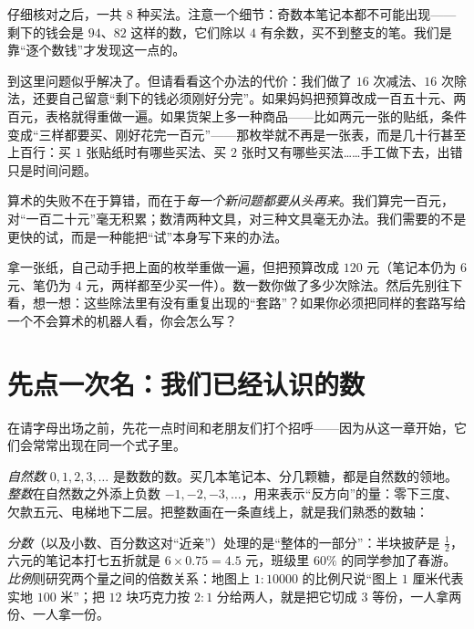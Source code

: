 仔细核对之后，一共 $8$ 种买法。注意一个细节：奇数本笔记本都不可能出现——剩下的钱会是 $94$、$82$ 这样的数，它们除以 $4$ 有余数，买不到整支的笔。我们是靠“逐个数钱”才发现这一点的。

到这里问题似乎解决了。但请看看这个办法的代价：我们做了 $16$ 次减法、$16$ 次除法，还要自己留意“剩下的钱必须刚好分完”。如果妈妈把预算改成一百五十元、两百元，表格就得重做一遍。如果货架上多一种商品——比如两元一张的贴纸，条件变成“三样都要买、刚好花完一百元”——那枚举就不再是一张表，而是几十行甚至上百行：买 $1$ 张贴纸时有哪些买法、买 $2$ 张时又有哪些买法……手工做下去，出错只是时间问题。

算术的失败不在于算错，而在于\emph{每一个新问题都要从头再来}。我们算完一百元，对“一百二十元”毫无积累；数清两种文具，对三种文具毫无办法。我们需要的不是更快的试，而是一种能把“试”本身写下来的办法。

\begin{shiyan}
拿一张纸，自己动手把上面的枚举重做一遍，但把预算改成 $120$ 元（笔记本仍为 $6$ 元、笔仍为 $4$ 元，两样都至少买一件）。数一数你做了多少次除法。然后先别往下看，想一想：这些除法里有没有重复出现的“套路”？如果你必须把同样的套路写给一个不会算术的机器人看，你会怎么写？
\end{shiyan}

\section{先点一次名：我们已经认识的数}

在请字母出场之前，先花一点时间和老朋友们打个招呼——因为从这一章开始，它们会常常出现在同一个式子里。

\emph{自然数} $0,1,2,3,\dots$ 是数数的数。买几本笔记本、分几颗糖，都是自然数的领地。\emph{整数}在自然数之外添上负数 $-1,-2,-3,\dots$，用来表示“反方向”的量：零下三度、欠款五元、电梯地下二层。把整数画在一条直线上，就是我们熟悉的数轴：

\begin{center}
\end{center}

\emph{分数}（以及小数、百分数这对“近亲”）处理的是“整体的一部分”：半块披萨是 $\frac{1}{2}$，六元的笔记本打七五折就是 $6\times 0.75=4.5$ 元，班级里 $60\%$ 的同学参加了春游。\emph{比例}则研究两个量之间的倍数关系：地图上 $1:10000$ 的比例尺说“图上 $1$ 厘米代表实地 $100$ 米”；把 $12$ 块巧克力按 $2:1$ 分给两人，就是把它切成 $3$ 等份，一人拿两份、一人拿一份。

